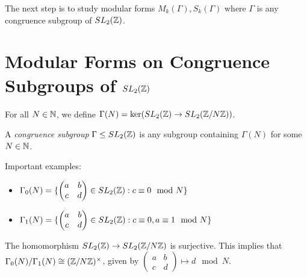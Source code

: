 \documentclass[10pt,a4paper]{article}
\begin{document}
The next step is to study modular forms $M_k(\Gamma), S_k(\Gamma)$ where $\Gamma$ is any congruence subgroup of $SL_2(\mathbb{Z})$.


\section{Modular Forms on Congruence Subgroups of \(SL_2(\mathbb{Z})\)}
\begin{definition}
  For all $N \in \mathbb{N}$, we define $\Gamma(N) = \ker(SL_2(\mathbb{Z}) \to SL_2(\mathbb{Z}/N\mathbb{Z}))$.

  A \emph{congruence subgroup} $\Gamma \leq SL_2(\mathbb{Z})$ is any subgroup containing $\Gamma(N)$ for some $N \in \mathbb{N}$.
\end{definition}
Important examples:
\begin{itemize}
  \item $\Gamma_0(N) = \{\begin{pmatrix} a&b\\c&d\end{pmatrix} \in SL_2(\mathbb{Z}): c \equiv 0 \mod N\}$
  \item $\Gamma_1(N) = \{\begin{pmatrix} a&b\\c&d\end{pmatrix} \in SL_2(\mathbb{Z}): c \equiv 0, a \equiv 1 \mod N\}$
\end{itemize}
The homomorphism $SL_2(\mathbb{Z}) \to SL_2(\mathbb{Z}/N\mathbb{Z})$ is surjective. This implies that $\Gamma_0(N)/\Gamma_1(N) \cong (\mathbb{Z}/N\mathbb{Z})^\times$, given by $\begin{pmatrix}a&b\\c&d\end{pmatrix}\mapsto d \mod N$.
\end{document}
